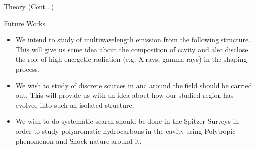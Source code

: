 \documentclass[12pt,a4paper]{beamer}
\begin{document}
\begin{frame}{Theory (Cont...)}
\begin{frame}
\begin{center}
\Large\bf\color{red}{Future Works}
\end{center}
\end{frame}
\begin{frame}{Future Works}
\begin{itemize}
\item We intend to study of multiwavelength emission from the following structure.
This will give us some idea about the composition of cavity and
also disclose the role of high energetic radiation (e.g. X-rays,
gamma rays) in the shaping process. \item We wish to study of
discrete sources in and around the field should be carried out.
This will provide us with an idea about how our studied region has
evolved into such an isolated structure.

\item We wish to do systematic search should be done in the
Spitzer Surveys in order to study polyaromatic hydrocarbons in the
cavity using Polytropic phenomenon and Shock nature around it.
\end{itemize}
\end{frame}



\end{frame}
\end{document}
